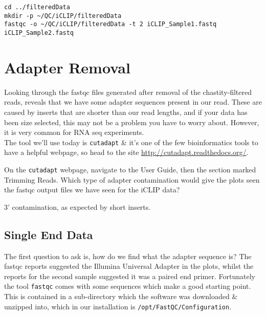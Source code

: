 \begin{steps}
\begin{lstlisting}
cd ../filteredData
mkdir -p ~/QC/iCLIP/filteredData
fastqc -o ~/QC/iCLIP/filteredData -t 2 iCLIP_Sample1.fastq iCLIP_Sample2.fastq
\end{lstlisting}
\end{steps}

\section{Adapter Removal}

Looking through the fastqc files generated after removal of the chastity-filtered reads, reveals that we have some adapter sequences present in our read.
These are caused by inserts that are shorter than our read lengths, and if your data has been size selected, this may not be a problem you have to worry about.
However, it is very common for RNA seq experiments.\\

The tool we'll use today is \texttt{cutadapt} \& it's one of the few bioinformatics tools to have a helpful webpage, so head to the site \url{http://cutadapt.readthedocs.org/}.

\begin{questions}
On the \texttt{cutadapt} webpage, navigate to the User Guide, then the section marked Trimming Reads.
Which type of adapter contamination would give the plots seen the fastqc output files we have seen for the iCLIP data?\\
\begin{answer}
3' contamination, as expected by short inserts.
\end{answer}
\end{questions}

\subsection{Single End Data}

The first question to ask is, how do we find what the adapter sequence is?
The fastqc reports suggested the Illumina Universal Adapter in the plots, whilst the reports for the second sample suggested it was a paired end primer.
Fortunately the tool \texttt{fastqc} comes with some sequences which make a good starting point.
This is contained in a sub-directory which the software was downloaded \& unzipped into, which in our installation is \texttt{/opt/FastQC/Configuration}.

